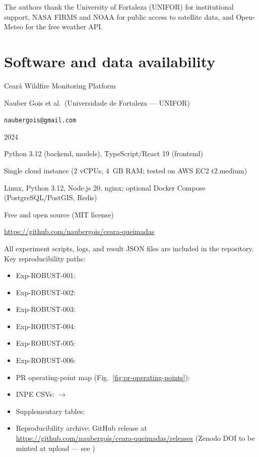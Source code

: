 \documentclass[preprint,12pt,times,numbers]{elsarticle}
\begin{document}
The authors thank the University of Fortaleza (UNIFOR) for institutional support, NASA FIRMS and NOAA for public access to satellite data, and Open-Meteo for the free weather API.

\section*{Software and data availability}

\begin{description}\setlength{\itemsep}{0.15em}
    \item[Name of software:] Cear\'{a} Wildfire Monitoring Platform
    \item[Developers:] Nauber Gois et al.\ (Universidade de Fortaleza --- UNIFOR)
    \item[Contact:] \texttt{naubergois@gmail.com}
    \item[Year first available:] 2024
    \item[Program language:] Python 3.12 (backend, models), TypeScript/React 19 (frontend)
    \item[Hardware requirements:] Single cloud instance (2 vCPUs, 4~GB RAM; tested on AWS EC2 t2.medium)
    \item[Software requirements:] Linux, Python 3.12, Node.js 20, nginx; optional Docker Compose (PostgreSQL/PostGIS, Redis)
    \item[Cost:] Free and open source (MIT license)
    \item[Availability:] \url{https://github.com/naubergois/ceara-queimadas}
\end{description}

All experiment scripts, logs, and result JSON files are included in the repository. Key reproducibility paths:
\begin{itemize}\setlength{\itemsep}{0.2em}
    \item Exp-ROBUST-001: 
    \item Exp-ROBUST-002: 
    \item Exp-ROBUST-003: 
    \item Exp-ROBUST-004: 
    \item Exp-ROBUST-005: 
    \item Exp-ROBUST-006: 
    \item PR operating-point map (Fig.~\ref{fig:pr-operating-points}): 
    \item INPE CSVs:  $\rightarrow$ 
    \item Supplementary tables: 
    \item Reproducibility archive: GitHub release  at \url{https://github.com/naubergois/ceara-queimadas/releases} (Zenodo DOI to be minted at upload --- see )
\end{itemize}
\end{document}
